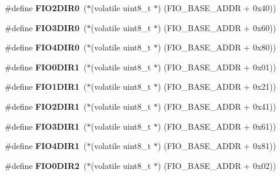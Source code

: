 \begin{DoxyCompactItemize}
\#define {\bfseries F\+I\+O2\+D\+I\+R0}~($\ast$(volatile uint8\+\_\+t $\ast$) (F\+I\+O\+\_\+\+B\+A\+S\+E\+\_\+\+A\+D\+DR + 0x40))
\item 
\mbox{\label{group__lpc24xx__regs_ga5f205c99308d4ac53c7e8f9f704c22d9}} 
\#define {\bfseries F\+I\+O3\+D\+I\+R0}~($\ast$(volatile uint8\+\_\+t $\ast$) (F\+I\+O\+\_\+\+B\+A\+S\+E\+\_\+\+A\+D\+DR + 0x60))
\item 
\mbox{\label{group__lpc24xx__regs_ga473fa5dff65f2dce6df3dec0df12e50b}} 
\#define {\bfseries F\+I\+O4\+D\+I\+R0}~($\ast$(volatile uint8\+\_\+t $\ast$) (F\+I\+O\+\_\+\+B\+A\+S\+E\+\_\+\+A\+D\+DR + 0x80))
\item 
\mbox{\label{group__lpc24xx__regs_ga0dfe53d7d7743664b3661fb5c888172a}} 
\#define {\bfseries F\+I\+O0\+D\+I\+R1}~($\ast$(volatile uint8\+\_\+t $\ast$) (F\+I\+O\+\_\+\+B\+A\+S\+E\+\_\+\+A\+D\+DR + 0x01))
\item 
\mbox{\label{group__lpc24xx__regs_ga159bb9da759f2f36aeef50fada446657}} 
\#define {\bfseries F\+I\+O1\+D\+I\+R1}~($\ast$(volatile uint8\+\_\+t $\ast$) (F\+I\+O\+\_\+\+B\+A\+S\+E\+\_\+\+A\+D\+DR + 0x21))
\item 
\mbox{\label{group__lpc24xx__regs_gae43619d20b6cccbf77b38cb51974afe1}} 
\#define {\bfseries F\+I\+O2\+D\+I\+R1}~($\ast$(volatile uint8\+\_\+t $\ast$) (F\+I\+O\+\_\+\+B\+A\+S\+E\+\_\+\+A\+D\+DR + 0x41))
\item 
\mbox{\label{group__lpc24xx__regs_gafa11b3434e555dbce7d5aa9df45566fc}} 
\#define {\bfseries F\+I\+O3\+D\+I\+R1}~($\ast$(volatile uint8\+\_\+t $\ast$) (F\+I\+O\+\_\+\+B\+A\+S\+E\+\_\+\+A\+D\+DR + 0x61))
\item 
\mbox{\label{group__lpc24xx__regs_gaa521f372891546d25444f54a4043d7aa}} 
\#define {\bfseries F\+I\+O4\+D\+I\+R1}~($\ast$(volatile uint8\+\_\+t $\ast$) (F\+I\+O\+\_\+\+B\+A\+S\+E\+\_\+\+A\+D\+DR + 0x81))
\item 
\mbox{\label{group__lpc24xx__regs_ga5e3ec787332d7951da3cab7d423546c8}} 
\#define {\bfseries F\+I\+O0\+D\+I\+R2}~($\ast$(volatile uint8\+\_\+t $\ast$) (F\+I\+O\+\_\+\+B\+A\+S\+E\+\_\+\+A\+D\+DR + 0x02))

\end{DoxyCompactItemize}
